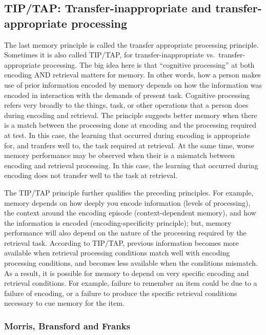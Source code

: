 \documentclass[
  oneside,
  12pt]{crumpbook}
\begin{document}
\hypertarget{tiptap-transfer-inappropriate-and-transfer-appropriate-processing}{%
\subsection{TIP/TAP: Transfer-inappropriate and transfer-appropriate processing}\label{tiptap-transfer-inappropriate-and-transfer-appropriate-processing}}

The last memory principle is called the transfer appropriate processing principle. Sometimes it is also called TIP/TAP, for transfer-inappropriate vs.~transfer-appropriate processing. The big idea here is that ``cognitive processing'' at both encoding AND retrieval matters for memory. In other words, how a person makes use of prior information encoded by memory depends on how the information was encoded in interaction with the demands of present task. Cognitive processing refers very broadly to the things, task, or other operations that a person does during encoding and retrieval. The principle suggests better memory when there is a match between the processing done at encoding and the processing required at test. In this case, the learning that occurred during encoding is appropriate for, and tranfers well to, the task required at retrieval. At the same time, worse memory performance may be observed when their is a mismatch between encoding and retrieval processing. In this case, the learning that occurred during encoding does not transfer well to the task at retrieval.

The TIP/TAP principle further qualifies the preceding principles. For example, memory depends on how deeply you encode information (levels of processing), the context around the encoding episode (context-dependent memory), and how the information is encoded (encoding-specificity principle); but, memory performance will also depend on the nature of the processing required by the retrieval task. According to TIP/TAP, previous information becomes more available when retrieval processing conditions match well with encoding processing conditions, and becomes less available when the conditions mismatch. As a result, it is possible for memory to depend on very specific encoding and retrieval conditions. For example, failure to remember an item could be due to a failure of encoding, or a failure to produce the specific retrieval conditions necessary to cue memory for the item.

\hypertarget{morris-bransford-and-franks}{%
\subsubsection{Morris, Bransford and Franks}\label{morris-bransford-and-franks}}
\end{document}

